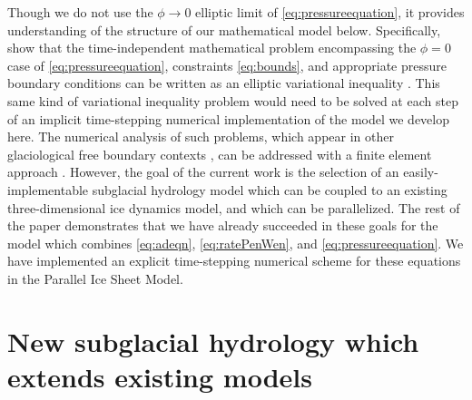\documentclass[11pt,final]{amsart}%
\begin{document}
Though we do not use the $\phi\to 0$ elliptic limit of \eqref{eq:pressureequation}, it provides understanding of the structure of our mathematical model below.  Specifically, \cite{Schoofetal2012} show that the time-independent mathematical problem encompassing the $\phi=0$ case of \eqref{eq:pressureequation}, constraints \eqref{eq:bounds}, and appropriate pressure boundary conditions can be written as an elliptic variational inequality \citep{KinderlehrerStampacchia}.  This same kind of variational inequality problem would need to be solved at each step of an implicit time-stepping numerical implementation of the model we develop here.  The numerical analysis of such problems, which appear in other glaciological free boundary contexts \citep{SchoofStream,JouvetBueler2012}, can be addressed with a finite element approach \citep{Ciarlet}.  However, the goal of the current work is the selection of an easily-implementable subglacial hydrology model which can be coupled to an existing three-dimensional ice dynamics model, and which can be parallelized.  The rest of the paper demonstrates that we have already succeeded in these goals for the model which combines \eqref{eq:adeqn}, \eqref{eq:ratePenWen}, and \eqref{eq:pressureequation}.  We have implemented an explicit time-stepping numerical scheme for these equations in the Parallel Ice Sheet Model.


\section{New subglacial hydrology which extends existing models}
\end{document}
